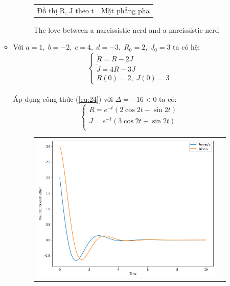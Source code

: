 \documentclass[a4paper]{article}
\begin{document}
\begin{enumerate}
\begin{itemize}
\begin{figure}[htp]
\begin{tabular}{cc}
            Đồ thị R, J theo t & Mặt phẳng pha
        \end{tabular}
        \caption{The love between a narcissistic nerd and a narcissistic nerd}
    \end{figure}
    \item Với $a = 1,\;b = -2,\;c = 4,\;d = -3,\;R_0 = 2,\;J_0 = 3$ ta có hệ:
    $$\begin{cases} \dot{R}=R-2J \\ \dot{J}=4R-3J \\ R(0)=2,\;J(0)=3 \end{cases}$$ \\
    Áp dụng công thức (\ref{eq:24}) với $\Delta = -16 < 0$ ta có:
    $$\begin{cases}
        R = e^{-t}\left(2 \cos{2t} - \sin{2t} \right) \\
        J = e^{-t}\left(3 \cos{2t} + \sin{2t} \right) \\
    \end{cases}$$
    \begin{figure}[htp]
        \centering
        \begin{tabular}{cc}
            \includegraphics[scale = .33]{Images/Bt2/5.2_gr.png} &

\end{tabular}
\end{figure}
\end{itemize}
\end{enumerate}
\end{document}
